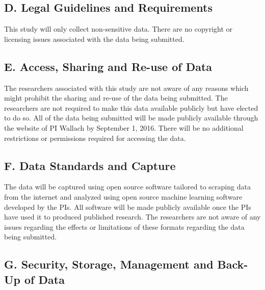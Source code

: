 \subsection*{D. Legal Guidelines and Requirements }
This study will only collect non-sensitive data. There are no copyright or licensing issues associated with the data being submitted.

\subsection*{E. Access, Sharing and Re-use of Data }

The researchers associated with this study are not aware of any reasons which might prohibit the
sharing and re-use of the data being submitted. The researchers are not required to make this data
available publicly but have elected to do so. All of the data being submitted will be made publicly available
through the website of PI Wallach by September 1, 2016. There
will be no additional restrictions or permissions required for accessing the data. %

\subsection*{F. Data Standards and Capture }
The data will be captured using open source software tailored to scraping data from the internet and analyzed using open source machine learning software developed by the PIs. All software will be made publicly available once the PIs have used it to produced published research. The researchers are not aware of any issues regarding the effects or limitations of these formats regarding the data being submitted.


\subsection*{G. Security, Storage, Management and Back-Up of Data }

